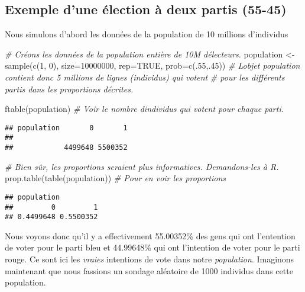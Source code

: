 \documentclass[
]{book}
\newenvironment{Shaded}{\begin{snugshade}}{\end{snugshade}}
\newcommand{\AttributeTok}[1]{\textcolor[rgb]{0.77,0.63,0.00}{#1}}
\newcommand{\CommentTok}[1]{\textcolor[rgb]{0.56,0.35,0.01}{\textit{#1}}}
\newcommand{\ConstantTok}[1]{\textcolor[rgb]{0.00,0.00,0.00}{#1}}
\newcommand{\DecValTok}[1]{\textcolor[rgb]{0.00,0.00,0.81}{#1}}
\newcommand{\FunctionTok}[1]{\textcolor[rgb]{0.00,0.00,0.00}{#1}}
\newcommand{\NormalTok}[1]{#1}
\newcommand{\OtherTok}[1]{\textcolor[rgb]{0.56,0.35,0.01}{#1}}
\begin{document}
\hypertarget{exemple-dune-uxe9lection-uxe0-deux-partis-55-45}{%
\subsection{Exemple d'une élection à deux partis (55-45)}\label{exemple-dune-uxe9lection-uxe0-deux-partis-55-45}}

Nous simulons d'abord les données de la population de 10 millions d'individus

\begin{Shaded}
\begin{Highlighting}[]
\CommentTok{\# Créons les données de la population entière de 10M d\textquotesingle{}électeurs.}
\NormalTok{population }\OtherTok{\textless{}{-}} \FunctionTok{sample}\NormalTok{(}\FunctionTok{c}\NormalTok{(}\DecValTok{1}\NormalTok{, }\DecValTok{0}\NormalTok{), }\AttributeTok{size=}\DecValTok{10000000}\NormalTok{, }\AttributeTok{rep=}\ConstantTok{TRUE}\NormalTok{, }\AttributeTok{prob=}\FunctionTok{c}\NormalTok{(.}\DecValTok{55}\NormalTok{,.}\DecValTok{45}\NormalTok{))}
\CommentTok{\# L\textquotesingle{}objet population contient donc 5 millions de lignes (individus) qui votent }
\CommentTok{\# pour les différents partis dans les proportions décrites.}

\FunctionTok{ftable}\NormalTok{(population) }\CommentTok{\# Voir le nombre d\textquotesingle{}individus qui votent pour chaque parti.}
\end{Highlighting}
\end{Shaded}

\begin{verbatim}
## population       0       1
##                           
##            4499648 5500352
\end{verbatim}

\begin{Shaded}
\begin{Highlighting}[]
\CommentTok{\# Bien sûr, les proportions seraient plus informatives. Demandons{-}les à R. }
\FunctionTok{prop.table}\NormalTok{(}\FunctionTok{table}\NormalTok{(population)) }\CommentTok{\# Pour en voir les proportions}
\end{Highlighting}
\end{Shaded}

\begin{verbatim}
## population
##         0         1 
## 0.4499648 0.5500352
\end{verbatim}

Nous voyons donc qu'il y a effectivement 55.00352\% des gens qui ont l'entention de voter pour le parti bleu et 44.99648\% qui ont l'intention de voter pour le parti rouge. Ce sont ici les \emph{vraies} intentions de vote dans notre \emph{population}. Imaginons maintenant que nous fassions un sondage aléatoire de 1000 individus dans cette population.
\end{document}
